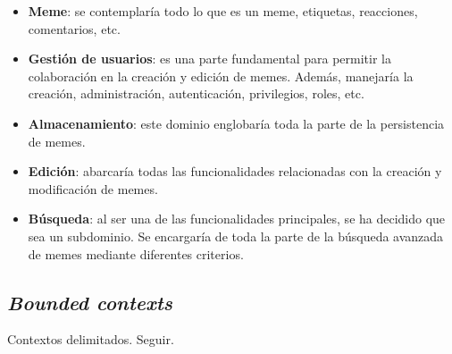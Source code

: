 \begin{itemize}
    \item \textbf{Meme}: se contemplaría todo lo que es un meme, etiquetas, reacciones, comentarios, etc.
    \item \textbf{Gestión de usuarios}: es una parte fundamental para permitir la colaboración en la creación y edición de memes. Además, manejaría la creación, administración, autenticación, privilegios, roles, etc.
    \item \textbf{Almacenamiento}: este dominio englobaría toda la parte de la persistencia de memes.
    \item \textbf{Edición}: abarcaría todas las funcionalidades relacionadas con la creación y modificación de memes.
    \item \textbf{Búsqueda}: al ser una de las funcionalidades principales, se ha decidido que sea un subdominio. Se encargaría de toda la parte de la búsqueda avanzada de memes mediante diferentes criterios.
\end{itemize}

\subsection{\textit{Bounded contexts}}

Contextos delimitados. Seguir.

